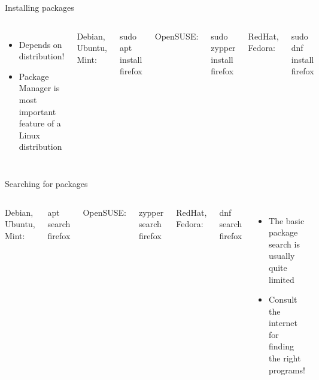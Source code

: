     \begin{frame}[t,fragile]{Installing packages}
        \begin{columns}[T]
            \begin{itemize}
                \item Depends on distribution!
                \item Package Manager is most important feature of a
                    Linux distribution
            \end{itemize}
            Debian, Ubuntu, Mint:
            \begin{bashenv}[\small]
sudo apt install firefox
            \end{bashenv}
            OpenSUSE:
            \begin{bashenv}[\small]
sudo zypper install firefox
            \end{bashenv}
            RedHat, Fedora:
            \begin{bashenv}[\small]
sudo dnf install firefox
            \end{bashenv}
        \end{columns}
    \end{frame}

    \begin{frame}[t,fragile]{Searching for packages}
        \begin{columns}[T]
            Debian, Ubuntu, Mint:
            \begin{bashenv}[\small]
apt search firefox
            \end{bashenv}
            OpenSUSE:
            \begin{bashenv}[\small]
zypper search firefox
            \end{bashenv}
            RedHat, Fedora:
            \begin{bashenv}[\small]
dnf search firefox
            \end{bashenv}
            \begin{itemize}
                \item The basic package search is usually quite limited
                \item Consult the internet for finding the right programs!
            \end{itemize}
        \end{columns}
    \end{frame}

